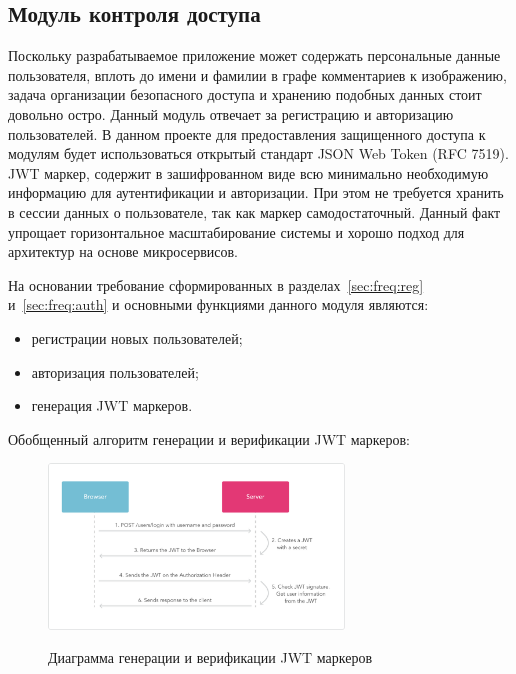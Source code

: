 \subsection{Модуль контроля доступа}
Поскольку разрабатываемое приложение может содержать персональные данные пользователя, вплоть до имени и фамилии в графе комментариев к изображению, задача организации безопасного доступа и хранению подобных данных стоит довольно остро.
Данный модуль отвечает за регистрацию и авторизацию пользователей. 
В данном проекте для предоставления защищенного доступа к модулям будет использоваться открытый стандарт JSON Web Token (RFC 7519). JWT маркер, содержит в зашифрованном виде всю минимально необходимую информацию для аутентификации и авторизации. При этом не требуется хранить в сессии данных о пользователе, так как маркер самодостаточный. Данный факт упрощает горизонтальное масштабирование системы и хорошо подход для архитектур на основе микросервисов.

На основании требование сформированных в разделах~\ref{sec:freq:reg} и~\ref{sec:freq:auth} и основными функциями данного модуля являются:
\begin{itemize}
  \item регистрации новых пользователей;
  \item авторизация пользователей;
  \item генерация JWT маркеров.
\end{itemize}

Обобщенный алгоритм генерации и верификации JWT маркеров:
\begin{figure}[ht]
    \centering
    \includegraphics[width=0.7\textwidth]{figures/jwt_diagram.png}
    \label{fig:architecture:jwt_diagram}
    \caption{Диаграмма генерации и верификации JWT маркеров}
\end{figure}

